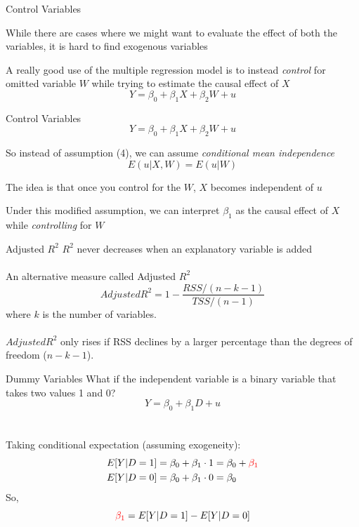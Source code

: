 \documentclass{./../div_teaching_slides}
\begin{document}
\begin{frame}{Control Variables}
\begin{witemize}
  \item While there are cases where we might want to evaluate the effect of both the variables, it is hard to find exogenous variables 
  \item A really good use of the multiple regression model is to instead \textit{control} for omitted variable $W$ while trying to estimate the causal effect of $X$
  $$ Y = \beta_0 + \beta_1 X + \beta_2 W + u  $$ 
\end{witemize}
\end{frame}

\begin{frame}{Control Variables}
  $$ Y = \beta_0 + \beta_1 X + \beta_2 W + u  $$ 
  \begin{witemize}
  \item So instead of assumption (4), we can assume \textit{conditional mean independence}  $$ E(u|X,W) = E(u|W) $$
  \item The idea is that once you control for the $W$, $X$ becomes independent of $u$
  \item Under this modified assumption, we can interpret $\beta_1$ as the causal effect of $X$ while \textit{controlling} for $W$ 
\end{witemize}
\end{frame}

\begin{frame}{Adjusted $R^2$}
$R^2$ never decreases when an explanatory variable is added \\~\\
An alternative measure called Adjusted $R^2$ 
$$ Adjusted R^2 = 1-\frac{RSS/(n-k-1)}{TSS/(n-1)} $$ 
where $k$ is the number of variables. \\~\\
$Adjusted R^2$ only rises if RSS declines by a larger percentage than the degrees
of freedom ($n-k-1$).
\end{frame}

\begin{frame}{Dummy Variables}
What if the independent variable is a binary variable that takes two values 1 and 0?  
$$ Y = \beta_0 + \beta_1 D + u  $$ \\~\\
Taking conditional expectation (assuming exogeneity):
\begin{align*}
	E[Y | D=1] &= \beta_0 + \beta_1 \cdot 1  = \beta_0 + \textcolor{red}{\beta_1} \\
	E[Y | D=0] &= \beta_0 + \beta_1 \cdot 0 = \beta_0 
\end{align*}
So, $$\textcolor{red}{\beta_1} = E[Y | D=1]-E[Y | D=0] $$  
\end{frame}
\end{document}
